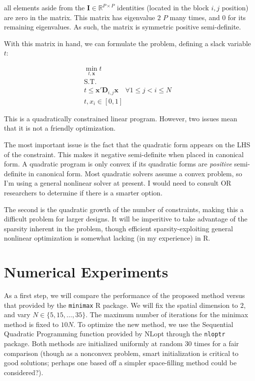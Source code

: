 \documentclass[]{article}
\begin{document}
all elements aside from the $\mathbf{I} \in \mathbb{R}^{P\times P}$ identities (located in the block $i,j$ position) are zero in the matrix. This matrix has eigenvalue $2$ $P$ many times, and $0$ for its remaining eigenvalues. As such, the matrix is symmetric positive semi-definite.

With this matrix in hand, we can formulate the problem, defining a slack variable $t$:

\begin{align*}
	\min_{t, \mathbf{x}} t\\
	\textrm{S.T.}\\
	t \leq \mathbf{x}'\mathbf{D}_{i,j}\mathbf{x} \hspace{1em} \forall 1 \leq j < i \leq N\\
	t,x_i \in [0,1]
\end{align*}

This is a quadratically constrained linear program. However, two issues mean that it is not a friendly optimization. 

The most important issue is the fact that the quadratic form appears on the LHS of the constraint. This makes it negative semi-definite when placed in canonical form. A quadratic program is only convex if its quadratic forms are \textit{positive} semi-definite in canonical form. Most quadratic solvers assume a convex problem, so I'm using a general nonlinear solver at present. I would need to consult OR researchers to determine if there is a smarter option.

The second is the quadratic growth of the number of constraints, making this a difficult problem for larger designs. It will be imperitive to take advantage of the sparsity inherent in the problem, though efficient sparsity-exploiting general nonlinear optimization is somewhat lacking (in my experience) in R.

\section{Numerical Experiments}

As a first step, we will compare the performance of the proposed method versus that provided by the \texttt{minimax} R package. We will fix the spatial dimension to $2$, and vary $N \in \{5, 15, \ldots, 35\}$. The maximum number of iterations for the minimax method is fixed to $10N$. To optimize the new method, we use the Sequential Quadratic Programming function provided by NLopt through the \texttt{nloptr} package. Both methods are initialized uniformly at random 30 times  for a fair comparison (though as a nonconvex problem, smart initialization is critical to good solutions; perhaps one based off a simpler space-filling method could be considered?).
\end{document}
